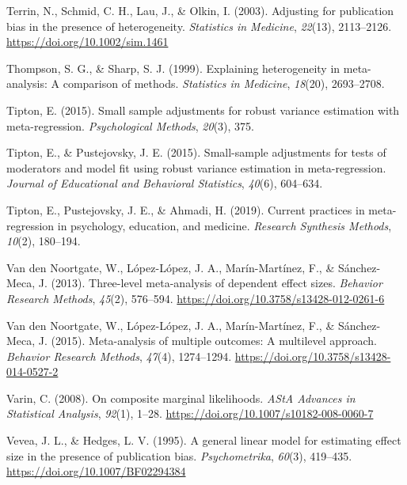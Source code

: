\documentclass[
  man, donotrepeattitle,floatsintext]{apa7}
\newlength{\cslhangindent}
\newenvironment{CSLReferences}[2] %
 {\begin{list}{}{%
  \setlength{\itemindent}{0pt}
  \setlength{\leftmargin}{0pt}
  \setlength{\parsep}{0pt}
  \ifodd #1
   \setlength{\leftmargin}{\cslhangindent}
   \setlength{\itemindent}{-1\cslhangindent}
  \fi
  \setlength{\itemsep}{#2\baselineskip}}}
 {\end{list}}
\begin{document}
\begin{CSLReferences}{1}{0}
Terrin, N., Schmid, C. H., Lau, J., \& Olkin, I. (2003). Adjusting for publication bias in the presence of heterogeneity. \emph{Statistics in Medicine}, \emph{22}(13), 2113--2126. \url{https://doi.org/10.1002/sim.1461}

Thompson, S. G., \& Sharp, S. J. (1999). Explaining heterogeneity in meta-analysis: A comparison of methods. \emph{Statistics in Medicine}, \emph{18}(20), 2693--2708.

Tipton, E. (2015). Small sample adjustments for robust variance estimation with meta-regression. \emph{Psychological Methods}, \emph{20}(3), 375.

Tipton, E., \& Pustejovsky, J. E. (2015). Small-sample adjustments for tests of moderators and model fit using robust variance estimation in meta-regression. \emph{Journal of Educational and Behavioral Statistics}, \emph{40}(6), 604--634.

Tipton, E., Pustejovsky, J. E., \& Ahmadi, H. (2019). Current practices in meta-regression in psychology, education, and medicine. \emph{Research Synthesis Methods}, \emph{10}(2), 180--194.

Van den Noortgate, W., López-López, J. A., Marín-Martínez, F., \& Sánchez-Meca, J. (2013). Three-level meta-analysis of dependent effect sizes. \emph{Behavior Research Methods}, \emph{45}(2), 576--594. \url{https://doi.org/10.3758/s13428-012-0261-6}

Van den Noortgate, W., López-López, J. A., Marín-Martínez, F., \& Sánchez-Meca, J. (2015). Meta-analysis of multiple outcomes: A multilevel approach. \emph{Behavior Research Methods}, \emph{47}(4), 1274--1294. \url{https://doi.org/10.3758/s13428-014-0527-2}

Varin, C. (2008). On composite marginal likelihoods. \emph{AStA Advances in Statistical Analysis}, \emph{92}(1), 1--28. \url{https://doi.org/10.1007/s10182-008-0060-7}

Vevea, J. L., \& Hedges, L. V. (1995). A general linear model for estimating effect size in the presence of publication bias. \emph{Psychometrika}, \emph{60}(3), 419--435. \url{https://doi.org/10.1007/BF02294384}


\end{CSLReferences}
\end{document}
